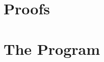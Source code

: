 \appendix
{}

\chapter{Proofs}\label{app:proofs}


\chapter{The Program}\label{app:program}






\makefacultybackcover


